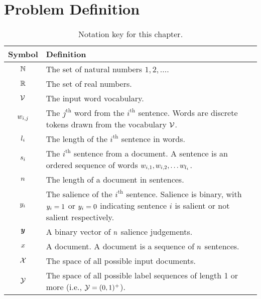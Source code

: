 \section{Problem Definition}



\begin{table}[t]
    \begin{center}
    \begin{tabular}{cp{}}
        \toprule
        Symbol & Definition \\
        \midrule
        $\mathbb{N}$ & The set of natural numbers $1,2,\ldots$.\\
        $\mathbb{R}$ & The set of real numbers.\\
        $\mathcal{V}$ & The input word vocabulary.\\[5pt] 
        $w_{i,j}$ & The $j^\textrm{th}$ word from the 
                        $i^\textrm{th}$ sentence. Words are discrete
                        tokens drawn from the vocabulary $\mathcal{V}$. \\[5pt]
                        $l_i$ & The length of the $i^\textrm{th}$ sentence in words. \\[5pt]
    $s_i$ & The $i^\textrm{th}$ sentence from a
                         document. A sentence is an ordered sequence of 
                         words $w_{i,1}, w_{i,2}, \ldots w_{l_i}$.\\[5pt]
                         $n$ & The length of a document in sentences.\\[5pt]
                         $y_i$ & The salience of the $i^\textrm{th}$ sentence. Salience is binary, with $y_i = 1$ or $y_i=0$ indicating sentence $i$ is salient or not salient respectively.\\
                         $\boldsymbol{y}$ & A binary vector of $n$ salience judgements.\\
                         $x$ & A document. A document is a sequence of $n$ sentences.\\
                         $\mathcal{X}$ & The space of all possible input documents.\\
                         $\mathcal{Y}$ & The space of all possible label sequences of length 1 or more (i.e., $\mathcal{Y} = (0,1)^+$).\\

                         \bottomrule
    \end{tabular}
    \end{center}
    \caption{Notation key for this chapter.}
    \label{dlsalnote}
\end{table}

